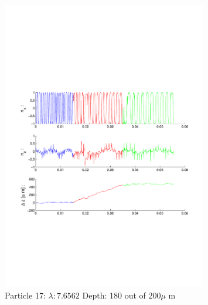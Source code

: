 \begin{figure}[H]

\includegraphics[width=0.8\textwidth]{Images/Particle 17/Particle17.pdf}

\caption{Particle 17:  $ \lambda: 7.6562$ Depth: 180 out of $200 \mu $ m}

\centering

\end{figure}

